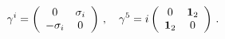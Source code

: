 \begin{equation}\label{(gammai)} 
\gamma^i = 
\left(
\begin{array}{cc}
0&\sigma_i\\
-\sigma_i&0
\end{array}\right)\,,\quad  
\gamma^5 =i
\left(
\begin{array}{cc}
0&{\bf 1}_2\\
{\bf 1}_2&0
\end{array}\right)\,.
\end{equation}

